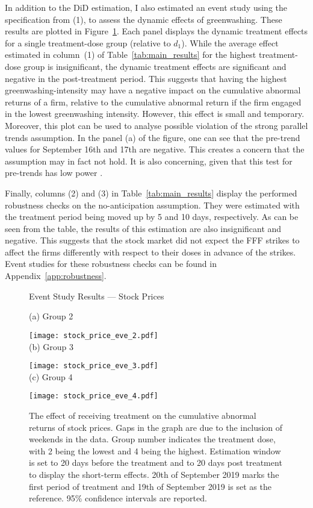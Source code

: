 \documentclass[12pt]{article}
\begin{document}
In addition to the DiD estimation, I also estimated an event study using the specification from (1), to assess the dynamic effects of greenwashing. These results are plotted in Figure~\ref{fig:eve_stock}. Each panel displays the dynamic treatment effects for a single treatment-dose group (relative to $d_1$). While the average effect estimated in column~(1) of Table~\ref{tab:main_results} for the highest treatment-dose group is insignificant, the dynamic treatment effects are significant and negative in the post-treatment period. This suggests that having the highest greenwashing-intensity may have a negative impact on the cumulative abnormal returns of a firm, relative to the cumulative abnormal return if the firm engaged in the lowest greenwashing intensity. However, this effect is small and temporary. Moreover, this plot can be used to analyse possible violation of the strong parallel trends assumption. In the panel (a) of the figure, one can see that the pre-trend values for September 16th and 17th are negative. This creates a concern that the assumption may in fact not hold. It is also concerning, given that this test for pre-trends has low power \parencite{rothWhatsTrendingDifferenceindifferences2023}.
                            

Finally, columns (2) and (3) in Table~\ref{tab:main_results} display the performed robustness checks on the no-anticipation assumption. They were estimated with the treatment period being moved up by 5 and 10 days, respectively. As can be seen from the table, the results of this estimation are also insignificant and negative. This suggests that the stock market did not expect the FFF strikes to affect the firms differently with respect to their doses in advance of the strikes. Event studies for these robustness checks can be found in Appendix~\ref{app:robustness}.


\begin{figure}
    \caption{Event Study Results --- Stock Prices}\label{fig:eve_stock}
    \centering
    
    (a) Group 2
    
    \texttt{[image: stock\_price\_eve\_2.pdf]} \\
    
    (b) Group 3
    
    \texttt{[image: stock\_price\_eve\_3.pdf]} \\
    
    (c) Group 4
    
    \texttt{[image: stock\_price\_eve\_4.pdf]}
    
    \captionsetup{font=footnotesize}
    \caption*{The effect of receiving treatment on the cumulative abnormal returns of stock prices. Gaps in the graph are due to the inclusion of weekends in the data. Group number indicates the treatment dose, with 2 being the lowest and 4 being the highest. Estimation window is set to 20 days before the treatment and to 20 days post treatment to display the short-term effects. 20th of September 2019 marks the first period of treatment and 19th of September 2019 is set as the reference. 95\% confidence intervals are reported.}
\end{figure}
\end{document}
